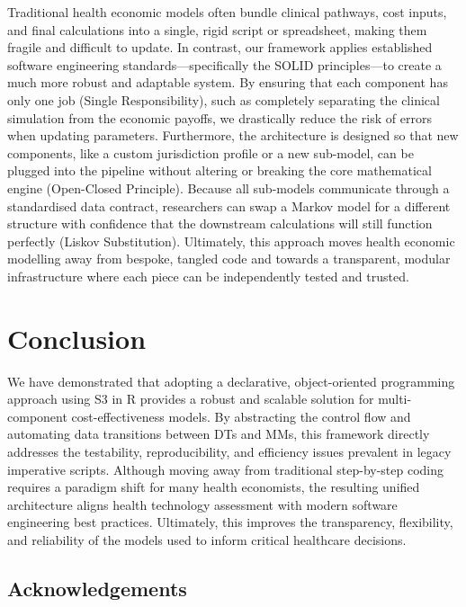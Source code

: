 \documentclass[
]{article}
\begin{document}
Traditional health economic models often bundle clinical pathways, cost
inputs, and final calculations into a single, rigid script or
spreadsheet, making them fragile and difficult to update. In contrast,
our framework applies established software engineering
standards---specifically the SOLID principles---to create a much more
robust and adaptable system. By ensuring that each component has only
one job (Single Responsibility), such as completely separating the
clinical simulation from the economic payoffs, we drastically reduce the
risk of errors when updating parameters. Furthermore, the architecture
is designed so that new components, like a custom jurisdiction profile
or a new sub-model, can be plugged into the pipeline without altering or
breaking the core mathematical engine (Open-Closed Principle). Because
all sub-models communicate through a standardised data contract,
researchers can swap a Markov model for a different structure with
confidence that the downstream calculations will still function
perfectly (Liskov Substitution). Ultimately, this approach moves health
economic modelling away from bespoke, tangled code and towards a
transparent, modular infrastructure where each piece can be
independently tested and trusted.

\section{Conclusion}\label{conclusion}

We have demonstrated that adopting a declarative, object-oriented
programming approach using S3 in R provides a robust and scalable
solution for multi-component cost-effectiveness models. By abstracting
the control flow and automating data transitions between DTs and MMs,
this framework directly addresses the testability, reproducibility, and
efficiency issues prevalent in legacy imperative scripts. Although
moving away from traditional step-by-step coding requires a paradigm
shift for many health economists, the resulting unified architecture
aligns health technology assessment with modern software engineering
best practices. Ultimately, this improves the transparency, flexibility,
and reliability of the models used to inform critical healthcare
decisions.

\subsection*{Acknowledgements}\label{acknowledgements}
\end{document}
